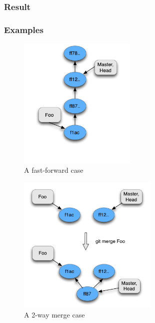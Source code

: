 \subsubsection{Result}

\subsubsection{Examples}

\begin{figure}[!t]
   \centering
   \includegraphics[width=0.5\textwidth]{images/fast_forward.png}
   \caption{A fast-forward case}\label{fig:fast_forward}
\end{figure}

\begin{figure}[!t]
   \centering
   \includegraphics[width=0.6\textwidth]{images/2merge.png}
   \caption{A 2-way merge case}\label{fig:2mergecase}
\end{figure}

